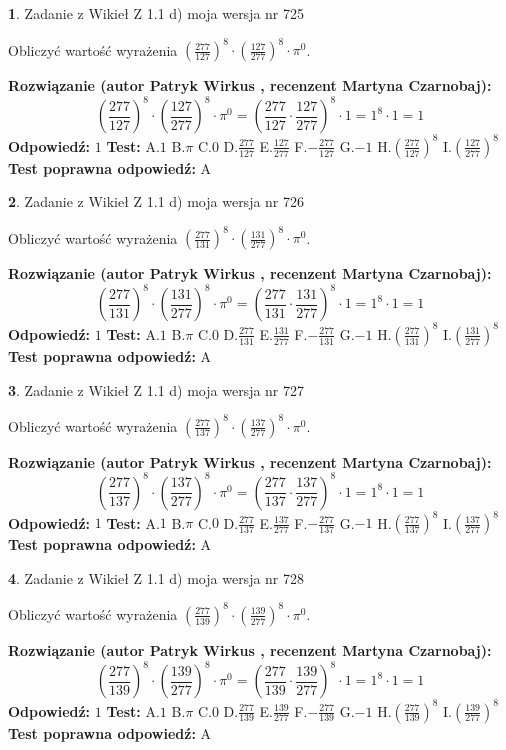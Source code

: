 \documentclass[12pt, a4paper]{article}
\theoremstyle{definition} %
\newtheorem{zad}{}
\newcommand{\zadStart}[1]{\begin{zad}#1\newline}
\newcommand{\zadStop}{\end{zad}}
\newcommand{\rozwStart}[2]{\noindent \textbf{Rozwiązanie (autor #1 , recenzent #2): }\newline}
\newcommand{\rozwStop}{\newline}
\newcommand{\odpStart}{\noindent \textbf{Odpowiedź:}\newline}
\newcommand{\odpStop}{\newline}
\newcommand{\testStart}{\noindent \textbf{Test:}\newline}
\newcommand{\testStop}{\newline}
\newcommand{\kluczStart}{\noindent \textbf{Test poprawna odpowiedź:}\newline}
\newcommand{\kluczStop}{\newline}
\begin{document}
\zadStart{Zadanie z Wikieł Z 1.1 d) moja wersja nr 725}

Obliczyć wartość wyrażenia $(\frac{277}{127})^{8} \cdot (\frac{127}{277})^{8} \cdot \pi^{0}$.
\zadStop
\rozwStart{Patryk Wirkus}{Martyna Czarnobaj}
$$(\frac{277}{127})^{8} \cdot (\frac{127}{277})^{8} \cdot \pi^{0} = (\frac{277}{127} \cdot \frac{127}{277})^{8} \cdot 1 = 1^{8} \cdot 1 = 1$$
\rozwStop
\odpStart
$1$
\odpStop
\testStart
A.$1$ B.$\pi$ C.$0$ D.$\frac{277}{127}$ E.$\frac{127}{277}$
F.$-\frac{277}{127}$ G.$-1$
H.$(\frac{277}{127})^{8}$
I.$(\frac{127}{277})^{8}$
\testStop
\kluczStart
A
\kluczStop



\zadStart{Zadanie z Wikieł Z 1.1 d) moja wersja nr 726}

Obliczyć wartość wyrażenia $(\frac{277}{131})^{8} \cdot (\frac{131}{277})^{8} \cdot \pi^{0}$.
\zadStop
\rozwStart{Patryk Wirkus}{Martyna Czarnobaj}
$$(\frac{277}{131})^{8} \cdot (\frac{131}{277})^{8} \cdot \pi^{0} = (\frac{277}{131} \cdot \frac{131}{277})^{8} \cdot 1 = 1^{8} \cdot 1 = 1$$
\rozwStop
\odpStart
$1$
\odpStop
\testStart
A.$1$ B.$\pi$ C.$0$ D.$\frac{277}{131}$ E.$\frac{131}{277}$
F.$-\frac{277}{131}$ G.$-1$
H.$(\frac{277}{131})^{8}$
I.$(\frac{131}{277})^{8}$
\testStop
\kluczStart
A
\kluczStop



\zadStart{Zadanie z Wikieł Z 1.1 d) moja wersja nr 727}

Obliczyć wartość wyrażenia $(\frac{277}{137})^{8} \cdot (\frac{137}{277})^{8} \cdot \pi^{0}$.
\zadStop
\rozwStart{Patryk Wirkus}{Martyna Czarnobaj}
$$(\frac{277}{137})^{8} \cdot (\frac{137}{277})^{8} \cdot \pi^{0} = (\frac{277}{137} \cdot \frac{137}{277})^{8} \cdot 1 = 1^{8} \cdot 1 = 1$$
\rozwStop
\odpStart
$1$
\odpStop
\testStart
A.$1$ B.$\pi$ C.$0$ D.$\frac{277}{137}$ E.$\frac{137}{277}$
F.$-\frac{277}{137}$ G.$-1$
H.$(\frac{277}{137})^{8}$
I.$(\frac{137}{277})^{8}$
\testStop
\kluczStart
A
\kluczStop



\zadStart{Zadanie z Wikieł Z 1.1 d) moja wersja nr 728}

Obliczyć wartość wyrażenia $(\frac{277}{139})^{8} \cdot (\frac{139}{277})^{8} \cdot \pi^{0}$.
\zadStop
\rozwStart{Patryk Wirkus}{Martyna Czarnobaj}
$$(\frac{277}{139})^{8} \cdot (\frac{139}{277})^{8} \cdot \pi^{0} = (\frac{277}{139} \cdot \frac{139}{277})^{8} \cdot 1 = 1^{8} \cdot 1 = 1$$
\rozwStop
\odpStart
$1$
\odpStop
\testStart
A.$1$ B.$\pi$ C.$0$ D.$\frac{277}{139}$ E.$\frac{139}{277}$
F.$-\frac{277}{139}$ G.$-1$
H.$(\frac{277}{139})^{8}$
I.$(\frac{139}{277})^{8}$
\testStop
\kluczStart
A
\kluczStop
\end{document}

